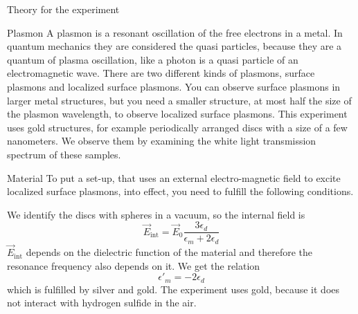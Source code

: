 \documentclass[pdftex, a4paper,11pt, twoside, UKenglish]{report}
\begin{document}
  
  
  
  
  
  
  
  
  
  \tableofcontents
  
  
  
  \begin{chapter}{Theory for the experiment}
    \label{chp:Theory}
    
    
    
    \begin{section}{Plasmon}
        A plasmon is a resonant oscillation of the free electrons in a metal.
        In quantum mechanics they are considered the quasi particles, because
        they are a quantum of plasma oscillation, like a photon is a quasi
        particle of an electromagnetic wave.
        There are two different kinds of plasmons, surface plasmons and
        localized surface plasmons.
        You can observe surface plasmons in larger metal structures, but you
        need a smaller structure, at most half the size of the plasmon
        wavelength, to observe localized surface plasmons.  
        This experiment uses gold structures, for example periodically arranged
        discs with a size of a few nanometers.
        We observe them by examining the white light transmission spectrum of
        these samples.
    \end{section}
    
    
    
    \begin{section}{Material}
        To put a set-up, that uses an external electro-magnetic field to excite
        localized surface plasmons, into effect, you need to fulfill the
        following conditions.

        We identify the discs with spheres in a vacuum, so the internal
        field is
        \begin{equation}
          \vec{E}_\text{int} = \vec E_0\frac{3\epsilon_d}
            {\epsilon_m+2\epsilon_d}
        \end{equation}
        $\vec E_\text{int}$ depends on the dielectric function of
        the material and therefore the resonance frequency also depends on it.
        We get the relation
        \begin{equation}
            \epsilon'_m = -2\epsilon_d
        \end{equation}
        which is fulfilled by silver and gold.
        The experiment uses gold, because it does not interact with hydrogen
        sulfide in the air.
    \end{section}
    

\end{chapter}
\end{document}
